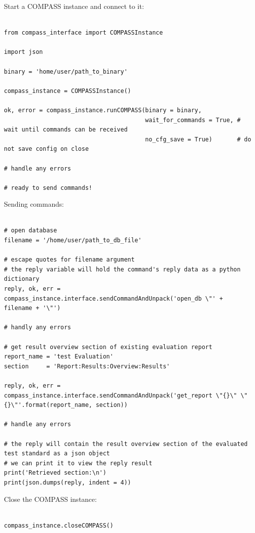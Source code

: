 Start a COMPASS instance and connect to it:

\begin{lstlisting}[basicstyle=\tiny\ttfamily]

from compass_interface import COMPASSInstance

import json

binary = 'home/user/path_to_binary'

compass_instance = COMPASSInstance() 

ok, error = compass_instance.runCOMPASS(binary = binary,
                                        wait_for_commands = True, # wait until commands can be received
                                        no_cfg_save = True)       # do not save config on close

# handle any errors

# ready to send commands!
\end{lstlisting}

Sending commands:

\begin{lstlisting}[basicstyle=\tiny\ttfamily]

# open database
filename = '/home/user/path_to_db_file'

# escape quotes for filename argument
# the reply variable will hold the command's reply data as a python dictionary
reply, ok, err = compass_instance.interface.sendCommandAndUnpack('open_db \"' + filename + '\"')

# handly any errors 

# get result overview section of existing evaluation report
report_name = 'test Evaluation'
section     = 'Report:Results:Overview:Results'

reply, ok, err = compass_instance.interface.sendCommandAndUnpack('get_report \"{}\" \"{}\"'.format(report_name, section))

# handle any errors 

# the reply will contain the result overview section of the evaluated test standard as a json object
# we can print it to view the reply result
print('Retrieved section:\n')
print(json.dumps(reply, indent = 4))

\end{lstlisting}

Close the COMPASS instance:

\begin{lstlisting}[basicstyle=\tiny\ttfamily]

compass_instance.closeCOMPASS()

\end{lstlisting}

